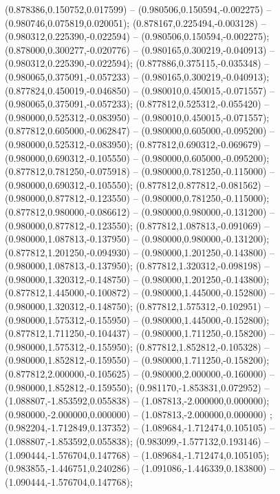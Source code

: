  (0.878386,0.150752,0.017599) -- (0.980506,0.150594,-0.002275) -- (0.980746,0.075819,0.020051);
 (0.878167,0.225494,-0.003128) -- (0.980312,0.225390,-0.022594) -- (0.980506,0.150594,-0.002275);
 (0.878000,0.300277,-0.020776) -- (0.980165,0.300219,-0.040913) -- (0.980312,0.225390,-0.022594);
 (0.877886,0.375115,-0.035348) -- (0.980065,0.375091,-0.057233) -- (0.980165,0.300219,-0.040913);
 (0.877824,0.450019,-0.046850) -- (0.980010,0.450015,-0.071557) -- (0.980065,0.375091,-0.057233);
 (0.877812,0.525312,-0.055420) -- (0.980000,0.525312,-0.083950) -- (0.980010,0.450015,-0.071557);
 (0.877812,0.605000,-0.062847) -- (0.980000,0.605000,-0.095200) -- (0.980000,0.525312,-0.083950);
 (0.877812,0.690312,-0.069679) -- (0.980000,0.690312,-0.105550) -- (0.980000,0.605000,-0.095200);
 (0.877812,0.781250,-0.075918) -- (0.980000,0.781250,-0.115000) -- (0.980000,0.690312,-0.105550);
 (0.877812,0.877812,-0.081562) -- (0.980000,0.877812,-0.123550) -- (0.980000,0.781250,-0.115000);
 (0.877812,0.980000,-0.086612) -- (0.980000,0.980000,-0.131200) -- (0.980000,0.877812,-0.123550);
 (0.877812,1.087813,-0.091069) -- (0.980000,1.087813,-0.137950) -- (0.980000,0.980000,-0.131200);
 (0.877812,1.201250,-0.094930) -- (0.980000,1.201250,-0.143800) -- (0.980000,1.087813,-0.137950);
 (0.877812,1.320312,-0.098198) -- (0.980000,1.320312,-0.148750) -- (0.980000,1.201250,-0.143800);
 (0.877812,1.445000,-0.100872) -- (0.980000,1.445000,-0.152800) -- (0.980000,1.320312,-0.148750);
 (0.877812,1.575312,-0.102951) -- (0.980000,1.575312,-0.155950) -- (0.980000,1.445000,-0.152800);
 (0.877812,1.711250,-0.104437) -- (0.980000,1.711250,-0.158200) -- (0.980000,1.575312,-0.155950);
 (0.877812,1.852812,-0.105328) -- (0.980000,1.852812,-0.159550) -- (0.980000,1.711250,-0.158200);
 (0.877812,2.000000,-0.105625) -- (0.980000,2.000000,-0.160000) -- (0.980000,1.852812,-0.159550);
 (0.981170,-1.853831,0.072952) -- (1.088807,-1.853592,0.055838) -- (1.087813,-2.000000,0.000000);
 (0.980000,-2.000000,0.000000) -- (1.087813,-2.000000,0.000000) ;
 (0.982204,-1.712849,0.137352) -- (1.089684,-1.712474,0.105105) -- (1.088807,-1.853592,0.055838);
 (0.983099,-1.577132,0.193146) -- (1.090444,-1.576704,0.147768) -- (1.089684,-1.712474,0.105105);
 (0.983855,-1.446751,0.240286) -- (1.091086,-1.446339,0.183800) -- (1.090444,-1.576704,0.147768);
